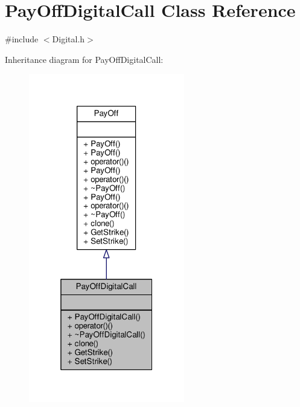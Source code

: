 \hypertarget{classPayOffDigitalCall}{}\section{Pay\+Off\+Digital\+Call Class Reference}
\label{classPayOffDigitalCall}


{\ttfamily \#include $<$Digital.\+h$>$}



Inheritance diagram for Pay\+Off\+Digital\+Call\+:
\nopagebreak
\begin{figure}[H]
\begin{center}
\leavevmode
\includegraphics[width=193pt]{classPayOffDigitalCall__inherit__graph}
\end{center}
\end{figure}


